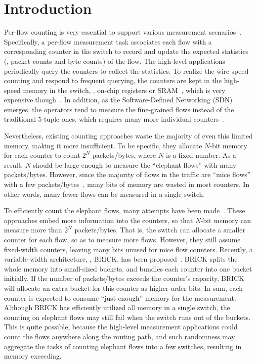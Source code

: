 \section{Introduction}\label{sec:intro}
Per-flow counting is very essential to support various measurement scenarios~\cite{Ran2017}.
Specifically, a per-flow measurement task associates each flow with a corresponding counter in the switch to record and update the expected statistics (\eg, packet counts and byte counts) of the flow.
The high-level applications periodically query the counters to collect the statistics.
To realize the wire-speed counting and respond to frequent querying, the counters are kept in the high-speed memory in the switch, \eg, on-chip registers or SRAM~\cite{Shah2002}, which is very expensive though~\cite{Hua2008}.
In addition, as the Software-Defined Networking (SDN) emerges, the operators tend to measure the fine-grained flows instead of the traditional 5-tuple ones, which requires many more individual counters~\cite{Xuan2017}.

Nevertheless, existing counting approaches waste the majority of even this limited memory, making it more insufficient.
To be specific, they allocate $N$-bit memory for each counter to count $2^N$ packets/bytes, where $N$ is a fixed number.
As a result, $N$ should be large enough to measure the ``elephant flows'' with many packets/bytes.
However, since the majority of flows in the traffic are ``mice flows'' with a few packets/bytes~\cite{Pareto_principle, Guo2001}, many bits of memory are wasted in most counters.
In other words, many fewer flows can be measured in a single switch.

To efficiently count the elephant flows, many attempts have been made~\cite{Shah2002, Ramabhadran2003, Roeder2004, Zhao2006, Cvetkovski2007, Stanojevic2007, Hu2010, Hu2012}.
These approaches embed more information into the counters, so that $N$-bit memory can measure more than $2^N$ packets/bytes.
That is, the switch can allocate a smaller counter for each flow, so as to measure more flows.
However, they still assume fixed-width counters, leaving many bits unused for mice flow counters.
Recently, a variable-width architecture, \ie, BRICK, has been proposed~\cite{Hua2008}.
BRICK splits the whole memory into small-sized buckets, and bundles each counter into one bucket initially.
If the number of packets/bytes exceeds the counter's capacity, BRICK will allocate an extra bucket for this counter as higher-order bits.
In sum, each counter is expected to consume ``just enough'' memory for the measurement.
Although BRICK has efficiently utilized all memory in a single switch, the counting on elephant flows may still fail when the switch runs out of the buckets.
This is quite possible, because the high-level measurement applications could count the flows anywhere along the routing path, and such randomness may aggregate the tasks of counting elephant flows into a few switches, resulting in memory exceeding.

